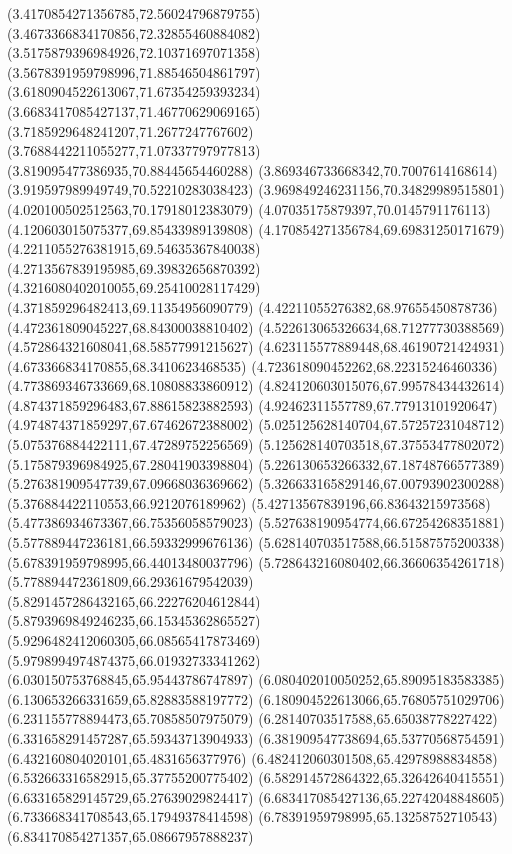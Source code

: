 {(3.4170854271356785,72.56024796879755)
(3.4673366834170856,72.32855460884082)
(3.5175879396984926,72.10371697071358)
(3.5678391959798996,71.88546504861797)
(3.6180904522613067,71.67354259393234)
(3.6683417085427137,71.46770629069165)
(3.7185929648241207,71.2677247767602)
(3.7688442211055277,71.07337797977813)
(3.819095477386935,70.88445654460288)
(3.869346733668342,70.7007614168614)
(3.919597989949749,70.52210283038423)
(3.969849246231156,70.34829989515801)
(4.020100502512563,70.17918012383079)
(4.07035175879397,70.0145791176113)
(4.120603015075377,69.85433989139808)
(4.170854271356784,69.69831250171679)
(4.2211055276381915,69.54635367840038)
(4.2713567839195985,69.39832656870392)
(4.3216080402010055,69.25410028117429)
(4.371859296482413,69.11354956090779)
(4.42211055276382,68.97655450878736)
(4.472361809045227,68.84300038810402)
(4.522613065326634,68.71277730388569)
(4.572864321608041,68.58577991215627)
(4.623115577889448,68.46190721424931)
(4.673366834170855,68.3410623468535)
(4.723618090452262,68.22315246460336)
(4.773869346733669,68.10808833860912)
(4.824120603015076,67.99578434432614)
(4.874371859296483,67.88615823882593)
(4.92462311557789,67.77913101920647)
(4.974874371859297,67.67462672388002)
(5.025125628140704,67.57257231048712)
(5.075376884422111,67.47289752256569)
(5.125628140703518,67.37553477802072)
(5.175879396984925,67.28041903398804)
(5.226130653266332,67.18748766577389)
(5.276381909547739,67.09668036369662)
(5.326633165829146,67.00793902300288)
(5.376884422110553,66.9212076189962)
(5.42713567839196,66.83643215973568)
(5.477386934673367,66.75356058579023)
(5.527638190954774,66.67254268351881)
(5.577889447236181,66.59332999676136)
(5.628140703517588,66.51587575200338)
(5.678391959798995,66.44013480037796)
(5.728643216080402,66.36606354261718)
(5.778894472361809,66.29361679542039)
(5.8291457286432165,66.22276204612844)
(5.8793969849246235,66.15345362865527)
(5.9296482412060305,66.08565417873469)
(5.9798994974874375,66.01932733341262)
(6.030150753768845,65.95443786747897)
(6.080402010050252,65.89095183583385)
(6.130653266331659,65.82883588197772)
(6.180904522613066,65.76805751029706)
(6.231155778894473,65.70858507975079)
(6.28140703517588,65.65038778227422)
(6.331658291457287,65.59343713904933)
(6.381909547738694,65.53770568754591)
(6.432160804020101,65.4831656377976)
(6.482412060301508,65.42978988834858)
(6.532663316582915,65.37755200775402)
(6.582914572864322,65.32642640415551)
(6.633165829145729,65.27639029824417)
(6.683417085427136,65.22742048848605)
(6.733668341708543,65.17949378414598)
(6.78391959798995,65.13258752710543)
(6.834170854271357,65.08667957888237)
}
